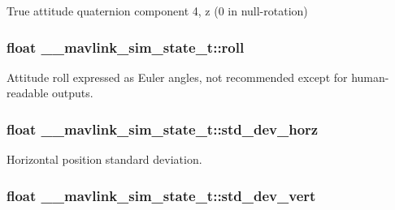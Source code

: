 True attitude quaternion component 4, z (0 in null-\/rotation) 

\hypertarget{struct____mavlink__sim__state__t_a58165fc0ced95f3db6546a9ccacf1705}{
\subsubsection[{roll}]{\setlength{\rightskip}{0pt plus 5cm}float \+\_\+\+\_\+mavlink\+\_\+sim\+\_\+state\+\_\+t\+::roll}}\label{struct____mavlink__sim__state__t_a58165fc0ced95f3db6546a9ccacf1705}


Attitude roll expressed as Euler angles, not recommended except for human-\/readable outputs. 

\hypertarget{struct____mavlink__sim__state__t_a9a60403fc2a9ff47b8b2132972968617}{
\subsubsection[{std\+\_\+dev\+\_\+horz}]{\setlength{\rightskip}{0pt plus 5cm}float \+\_\+\+\_\+mavlink\+\_\+sim\+\_\+state\+\_\+t\+::std\+\_\+dev\+\_\+horz}}\label{struct____mavlink__sim__state__t_a9a60403fc2a9ff47b8b2132972968617}


Horizontal position standard deviation. 

\hypertarget{struct____mavlink__sim__state__t_a2176290431f1ee212e6d569e495a219f}{
\subsubsection[{std\+\_\+dev\+\_\+vert}]{\setlength{\rightskip}{0pt plus 5cm}float \+\_\+\+\_\+mavlink\+\_\+sim\+\_\+state\+\_\+t\+::std\+\_\+dev\+\_\+vert}}\label{struct____mavlink__sim__state__t_a2176290431f1ee212e6d569e495a219f}


